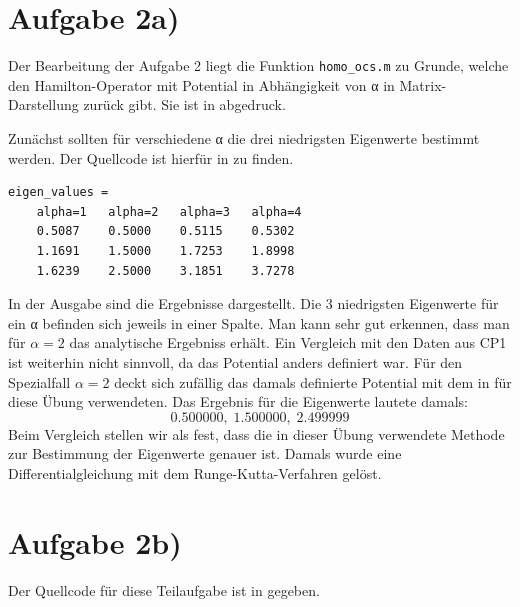 \section*{Aufgabe 2a)}

Der Bearbeitung der Aufgabe 2 liegt die Funktion \texttt{homo\_ocs.m} zu Grunde,
welche den Hamilton-Operator mit Potential in Abhängigkeit von α in Matrix-Darstellung
zurück gibt. Sie ist in  abgedruck.



Zunächst sollten für verschiedene α die drei niedrigsten Eigenwerte bestimmt werden.
Der Quellcode ist hierfür in  zu finden.


\begin{lstlisting}[caption=Ausgabe von \lref{2a},label=2aa]
eigen_values =
    alpha=1   alpha=2   alpha=3   alpha=4
    0.5087    0.5000    0.5115    0.5302
    1.1691    1.5000    1.7253    1.8998
    1.6239    2.5000    3.1851    3.7278
\end{lstlisting}

In der Ausgabe  sind die Ergebnisse dargestellt. Die 3 niedrigsten Eigenwerte
für ein α befinden sich jeweils in einer Spalte. Man kann sehr gut erkennen, dass man für
$α = 2$ das analytische Ergebniss erhält. Ein Vergleich mit den Daten aus CP1 ist
weiterhin nicht sinnvoll, da das Potential anders definiert war. Für den Spezialfall
$α = 2$ deckt sich zufällig das damals definierte Potential mit dem in für diese
Übung verwendeten. Das Ergebnis für die Eigenwerte lautete damals:
\begin{equation*}
0.500000,\;1.500000,\;2.499999
\end{equation*}
Beim Vergleich stellen wir als fest, dass die in dieser Übung verwendete Methode
zur Bestimmung der Eigenwerte genauer ist. Damals wurde eine Differentialgleichung
mit dem Runge-Kutta-Verfahren gelöst.



\section*{Aufgabe 2b)}

Der Quellcode für diese Teilaufgabe ist in  gegeben.


